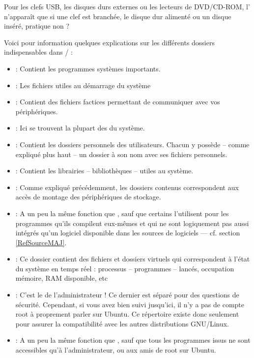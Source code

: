 \begin{nota}
Pour les clefs USB, les disques durs externes ou les lecteurs de DVD/CD-ROM, l' n'apparaît que si une clef est branchée, le disque dur alimenté ou un disque inséré, pratique non ?
\end{nota}
Voici pour information quelques explications sur les différents dossiers indispensables dans / :
\begin{itemize}
\item {} : Contient les programmes systèmes importants.
\item {} : Les fichiers utiles au démarrage du système
\item {} : Contient des fichiers factices permettant de communiquer avec vos périphériques.
\item {} : Ici se trouvent la plupart des  du système.
\item {} : Contient les dossiers personnels des utilisateurs. Chacun y possède -- comme expliqué plus haut -- un dossier à son nom avec ses fichiers personnels.
\item {} : Contient les librairies -- bibliothèques -- utiles au système.
\item {} : Comme expliqué précédemment, les dossiers contenus correspondent aux accès de montage des périphériques de stockage.
\item {} : A un peu la même fonction que , sauf que certains l'utilisent pour les programmes qu'ils compilent eux-mêmes et qui ne sont logiquement pas aussi intégrés qu'un logiciel disponible dans les sources de logiciels --- cf. section \ref{RefSourceMAJ}.
\item {} : Ce dossier contient des fichiers et dossiers virtuels qui correspondent à l'état du système en temps réel : processus -- programmes -- lancés, occupation mémoire, RAM disponible, etc
\item {} : C'est le  de l'administrateur ! Ce dernier est séparé pour des questions de sécurité. Cependant, si vous avez bien suivi jusqu'ici, il n'y a pas de compte root à proprement parler sur Ubuntu. Ce répertoire existe donc seulement pour assurer la compatibilité avec les autres distributions GNU/Linux.
\item {} : A un peu la même fonction que , sauf que tous les programmes issus ne sont accessibles qu'à l'administrateur, ou aux amis de root sur Ubuntu.

\end{itemize}
